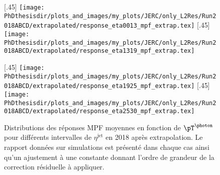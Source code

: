\begin{figure}[p]
\centering
{}[.45\textwidth]
{\texttt{[image: \\PhDthesisdir/plots\_and\_images/my\_plots/JERC/only\_L2Res/Run2018ABCD/extrapolated/response\_eta0013\_mpf\_extrap.tex]}}
\hfill
{}[.45\textwidth]
{\texttt{[image: \\PhDthesisdir/plots\_and\_images/my\_plots/JERC/only\_L2Res/Run2018ABCD/extrapolated/response\_eta1319\_mpf\_extrap.tex]}}

\vfill

[.45\textwidth]
{\texttt{[image: \\PhDthesisdir/plots\_and\_images/my\_plots/JERC/only\_L2Res/Run2018ABCD/extrapolated/response\_eta1925\_mpf\_extrap.tex]}}
\hfill
{}[.45\textwidth]
{\texttt{[image: \\PhDthesisdir/plots\_and\_images/my\_plots/JERC/only\_L2Res/Run2018ABCD/extrapolated/response\_eta2530\_mpf\_extrap.tex]}}

\caption[Réponses MPF en 2018 apr\`es extrapolation.]{Distributions des réponses MPF moyennes en fonction de $\pT^{\text{\photon}}$ pour différents intervalles de $\eta^\text{jet}$ en 2018 apr\`es extrapolation. Le rapport données sur simulations est présenté dans chaque cas ainsi qu'un ajustement à une constante donnant l'ordre de grandeur de la correction résiduelle à appliquer.}
\label{fig-responses_MPF_extrapolated_2018ABCD}
\end{figure}